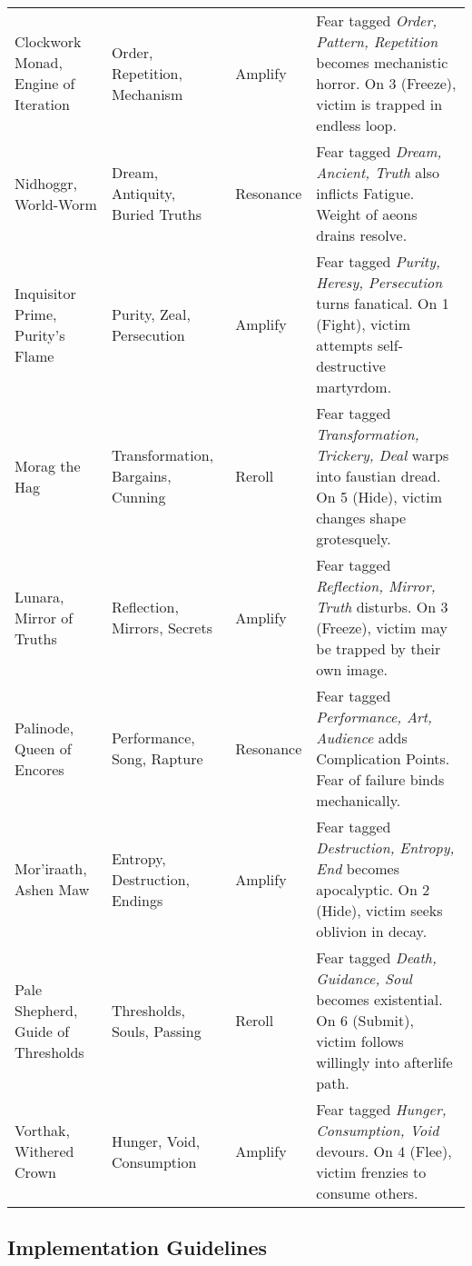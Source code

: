 \begin{longtable}{@{}p{3.2cm}p{4.5cm}p{2.8cm}p{5.9cm}@{}}
Clockwork Monad, Engine of Iteration & Order, Repetition, Mechanism & Amplify & 
Fear tagged \emph{Order, Pattern, Repetition} becomes mechanistic horror. On 3 (Freeze), victim is trapped in endless loop. \\

Nidhoggr, World-Worm & Dream, Antiquity, Buried Truths & Resonance & 
Fear tagged \emph{Dream, Ancient, Truth} also inflicts Fatigue. Weight of aeons drains resolve. \\

Inquisitor Prime, Purity's Flame & Purity, Zeal, Persecution & Amplify & 
Fear tagged \emph{Purity, Heresy, Persecution} turns fanatical. On 1 (Fight), victim attempts self-destructive martyrdom. \\

Morag the Hag & Transformation, Bargains, Cunning & Reroll & 
Fear tagged \emph{Transformation, Trickery, Deal} warps into faustian dread. On 5 (Hide), victim changes shape grotesquely. \\

Lunara, Mirror of Truths & Reflection, Mirrors, Secrets & Amplify & 
Fear tagged \emph{Reflection, Mirror, Truth} disturbs. On 3 (Freeze), victim may be trapped by their own image. \\

Palinode, Queen of Encores & Performance, Song, Rapture & Resonance & 
Fear tagged \emph{Performance, Art, Audience} adds Complication Points. Fear of failure binds mechanically. \\

Mor'iraath, Ashen Maw & Entropy, Destruction, Endings & Amplify & 
Fear tagged \emph{Destruction, Entropy, End} becomes apocalyptic. On 2 (Hide), victim seeks oblivion in decay. \\

Pale Shepherd, Guide of Thresholds & Thresholds, Souls, Passing & Reroll & 
Fear tagged \emph{Death, Guidance, Soul} becomes existential. On 6 (Submit), victim follows willingly into afterlife path. \\

Vorthak, Withered Crown & Hunger, Void, Consumption & Amplify & 
Fear tagged \emph{Hunger, Consumption, Void} devours. On 4 (Flee), victim frenzies to consume others. \\

\bottomrule
\end{longtable}

\subsection{Implementation Guidelines}
\label{subsec:patron-fear-guidelines}

